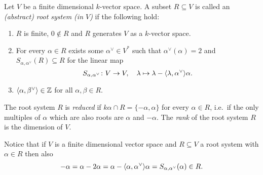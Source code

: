 \begin{definition}
 Let $V$ be a finite dimensional $k$-vector space. A subset $R \subseteq V$ is called an \emph{(abstract) root system (in $V$)} if the following hold:
 \begin{enumerate}
  \item
   $R$ is finite, $0 \notin R$ and $R$ generates $V$ as a $k$-vector space.
  \item
   For every $\alpha \in R$ exists some $\alpha^\vee \in V^*$ such that $\alpha^\vee(\alpha) = 2$ and $S_{\alpha, \alpha^\vee}(R) \subseteq R$ for the linear map
   \[
    S_{\alpha, \alpha^\vee} \colon V \to V, \quad
    \lambda \mapsto \lambda - \langle\lambda, \alpha^\vee\rangle\alpha.
   \]
   \item
    $\langle\alpha, \beta^\vee\rangle \in \mathbb{Z}$ for all $\alpha, \beta \in R$.
 \end{enumerate}
 The root system $R$ is \emph{reduced} if $k \alpha \cap R = \{-\alpha, \alpha\}$ for every $\alpha \in R$, i.e.\ if the only multiples of $\alpha$ which are also roots are $\alpha$ and $-\alpha$. The \emph{rank} of the root system $R$ is the dimension of $V$.
\end{definition}


\begin{remark}\label{rem: -alpha also in the root system}
 Notice that if $V$ is a finite dimensional vector space and $R \subseteq V$ a root system with $\alpha \in R$ then also
 \[
  -\alpha = \alpha - 2 \alpha = \alpha - \langle\alpha, \alpha^\vee\rangle \alpha = S_{\alpha, \alpha^\vee}(\alpha) \in R.
 \]
\end{remark}


